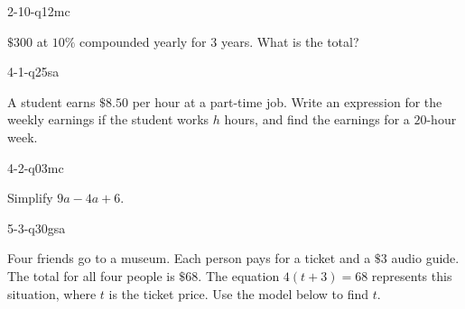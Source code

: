 \begin{practiceQuestion}{2-10-q12}{mc}
\begin{questionText}
$\$300$ at $10\%$ compounded yearly for $3$ years. What is the total?
\end{questionText}
\end{practiceQuestion}

\begin{practiceQuestion}{4-1-q25}{sa}
\begin{questionText}
A student earns $\$8.50$ per hour at a part-time job. Write an expression for the weekly earnings if the student works $h$ hours, and find the earnings for a $20$-hour week.
\end{questionText}
\end{practiceQuestion}

\begin{practiceQuestion}{4-2-q03}{mc}
\begin{questionText}
Simplify $9a - 4a + 6$.
\end{questionText}
\end{practiceQuestion}

\begin{practiceQuestion}{5-3-q30}{gsa}
\begin{questionText}
Four friends go to a museum. Each person pays for a ticket and a $\$3$ audio guide. The total for all four people is $\$68$. The equation $4(t + 3) = 68$ represents this situation, where $t$ is the ticket price. Use the model below to find $t$.

\begin{center}
\end{center}
\end{questionText}
\end{practiceQuestion}

